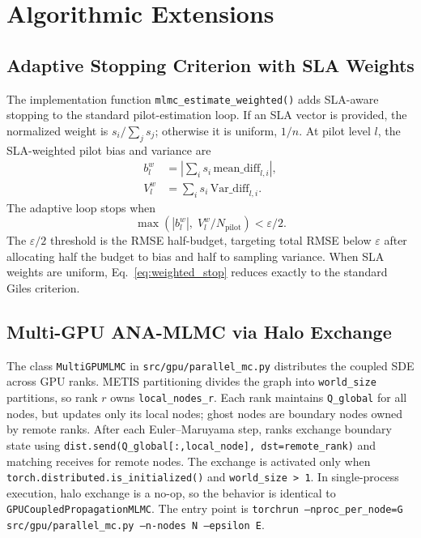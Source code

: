 \documentclass[journal]{IEEEtran}
\begin{document}
\section{Algorithmic Extensions}

\subsection{Adaptive Stopping Criterion with SLA Weights}

The implementation function \texttt{mlmc\_estimate\_weighted()} adds SLA-aware stopping to the
standard pilot-estimation loop. If an SLA vector is provided, the normalized weight is
$s_i/\sum_j s_j$; otherwise it is uniform, $1/n$. At pilot level $l$, the SLA-weighted pilot
bias and variance are
\begin{align}
    b_l^w &= \left|\sum_i s_i\,\mathrm{mean\_diff}_{l,i}\right|, \\
    V_l^w &= \sum_i s_i\,\mathrm{Var\_diff}_{l,i}.
\end{align}
The adaptive loop stops when
\begin{equation}
    \max\left(|b_l^w|,\; V_l^w/N_{\mathrm{pilot}}\right)<\varepsilon/2.
    \label{eq:weighted_stop}
\end{equation}
The $\varepsilon/2$ threshold is the RMSE half-budget, targeting total RMSE below
$\varepsilon$ after allocating half the budget to bias and half to sampling variance. When SLA
weights are uniform, Eq.~\eqref{eq:weighted_stop} reduces exactly to the standard Giles
criterion.

\subsection{Multi-GPU ANA-MLMC via Halo Exchange}

The class \texttt{MultiGPUMLMC} in \texttt{src/gpu/parallel\_mc.py} distributes the coupled SDE
across GPU ranks. METIS partitioning divides the graph into \texttt{world\_size} partitions, so
rank $r$ owns \texttt{local\_nodes\_r}. Each rank maintains \texttt{Q\_global} for all nodes, but
updates only its local nodes; ghost nodes are boundary nodes owned by remote ranks. After each
Euler--Maruyama step, ranks exchange boundary state using
\texttt{dist.send(Q\_global[:,local\_node], dst=remote\_rank)} and matching receives for remote
nodes. The exchange is activated only when \texttt{torch.distributed.is\_initialized()} and
\texttt{world\_size > 1}. In single-process execution, halo exchange is a no-op, so the behavior
is identical to \texttt{GPUCoupledPropagationMLMC}. The entry point is
\texttt{torchrun --nproc\_per\_node=G src/gpu/parallel\_mc.py --n-nodes N --epsilon E}.
\end{document}
